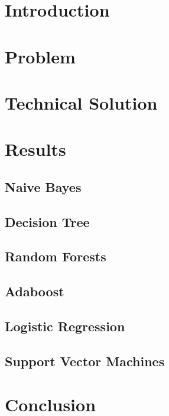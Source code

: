 \section{Introduction}

\section{Problem}


\section{Technical Solution}


\section{Results}

\subsection{Naive Bayes}

\subsection{Decision Tree}

\subsection{Random Forests}

\subsection{Adaboost}

\subsection{Logistic Regression}

\subsection{Support Vector Machines}

\section{Conclusion}





\appendix


\begin{acks}

\end{acks}
